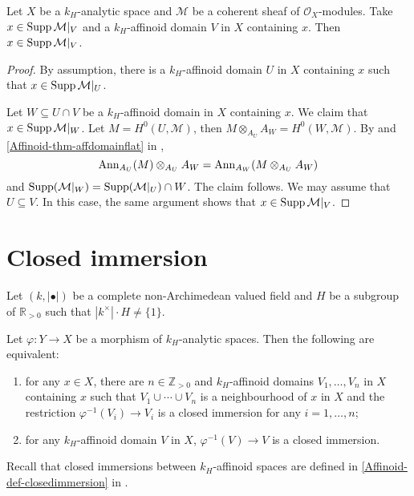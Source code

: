 \begin{lemma}
    Let $X$ be a $k_H$-analytic space and $\mathcal{M}$ be a coherent sheaf of $\mathcal{O}_X$-modules. Take $x\in \operatorname{Supp} \mathcal{M}|_V$ and a $k_H$-affinoid domain $V$ in $X$ containing $x$. Then $x\in \operatorname{Supp} \mathcal{M}|_V$.
\end{lemma}
\begin{proof}
By assumption, there is a $k_H$-affinoid domain $U$ in $X$ containing $x$ such that $x\in \operatorname{Supp}\mathcal{M}|_U$. 

Let $W\subseteq U\cap V$ be a $k_H$-affinoid domain in $X$ containing $x$. We claim that $x\in \operatorname{Supp} \mathcal{M}|_W$. Let $M=H^0(U,\mathcal{M})$, then $M\otimes_{A_U} A_W=H^0(W,\mathcal{M})$. By \cite[\href{https://stacks.math.columbia.edu/tag/07T8}{Tag 07T8}]{stacks-project} and \cref{Affinoid-thm-affdomainflat} in ,
\[
    \mathrm{Ann}_{A_U}(M)\otimes_{A_U} A_W=    \mathrm{Ann}_{A_W}(M\otimes_{A_U}A_W)
\]  
and $\operatorname{Supp} (\mathcal{M}|_W)=\operatorname{Supp} (\mathcal{M}|_U)\cap W$.
The claim follows. We may assume that $U\subseteq V$. In this case, the same argument shows that $x\in \operatorname{Supp} \mathcal{M}|_V$.
\end{proof}


\section{Closed immersion}
Let $(k,|\bullet|)$ be a complete non-Archimedean valued field and $H$ be a subgroup of $\mathbb{R}_{>0}$ such that $|k^{\times}|\cdot H\neq \{1\}$.

\begin{lemma}\label{lma-closedimmglocal}
    Let $\varphi:Y\rightarrow X$ be a morphism of $k_H$-analytic spaces. Then the following are equivalent:
    \begin{enumerate}
        \item for any $x\in X$, there are $n\in \mathbb{Z}_{>0}$ and $k_H$-affinoid domains $V_1,\ldots,V_n$ in $X$ containing $x$ such that $V_1\cup\cdots\cup V_n$ is a neighbourhood of $x$ in $X$ and the restriction $\varphi^{-1}(V_i)\rightarrow V_i$ is a closed immersion for any $i=1,\ldots,n$;
        \item for any $k_H$-affinoid domain $V$ in $X$, $\varphi^{-1}(V)\rightarrow V$ is a closed immersion.
    \end{enumerate}
\end{lemma}
Recall that closed immersions between $k_H$-affinoid spaces are defined in \cref{Affinoid-def-closedimmersion} in . 

